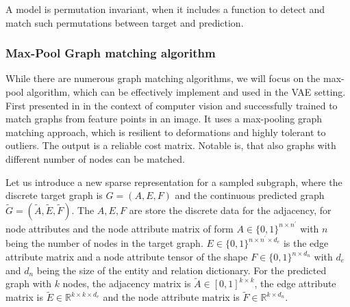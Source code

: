 A model is permutation invariant, when it includes a function to detect and match such permutations between target and prediction. 



\subsubsection{Max-Pool Graph matching algorithm}


While there are numerous graph matching algorithms, we will focus on the max-pool algorithm, which can be effectively implement and used in the VAE setting. First presented in \cite{cho_finding_2014} in the context of computer vision and successfully trained to match graphs from feature points in an image. It uses a max-pooling graph matching approach, which is resilient to deformations and highly tolerant to outliers. The output is a reliable cost matrix. Notable is, that also graphs with different number of nodes can be matched.


Let us introduce a new sparse representation for a sampled subgraph, where the discrete target graph is $G=(A, E, F)$ and the continuous predicted graph $\widetilde{G}=(\widetilde{A}, \widetilde{E}, \widetilde{F})$. The $A, E, F$ are store the discrete data for the adjacency, for node attributes and the node attribute matrix of form $A \in\{0,1\}^{n \times n^{\prime}}$ with $n$ being the number of nodes in the target graph. $E\in\{0,1\}^{n \times n^{\prime} \times d_e}$ is the edge attribute matrix and a node attribute tensor of the shape $F\in\{0,1\}^{n \times d_n}$ with $d_e$ and $d_n$ being the size of the entity and relation dictionary. For the predicted graph with $k$ nodes, the adjacency matrix is $\widetilde{A} \in[0,1]^{k \times k}$, the edge attribute matrix is $\widetilde{E} \in \mathbb{R}^{k \times k \times d_{e}}$ and the node attribute matrix is $\widetilde{F} \in \mathbb{R}^{k \times d_{n}}$.


